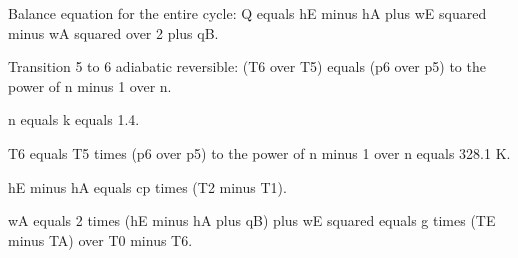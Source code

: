 Balance equation for the entire cycle:
Q equals hE minus hA plus wE squared minus wA squared over 2 plus qB.

Transition 5 to 6 adiabatic reversible:
(T6 over T5) equals (p6 over p5) to the power of n minus 1 over n.

n equals k equals 1.4.

T6 equals T5 times (p6 over p5) to the power of n minus 1 over n equals 328.1 K.

hE minus hA equals cp times (T2 minus T1).

wA equals 2 times (hE minus hA plus qB) plus wE squared equals g times (TE minus TA) over T0 minus T6.